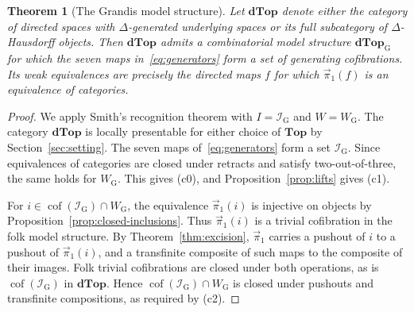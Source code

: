 \documentclass[12pt,a4paper]{amsart}
\newtheorem{theorem}{Theorem}[section]
\theoremstyle{definition}
\renewcommand{\vec}{\overrightarrow}
\newcommand{\D}{\mathbf{dTop}}
\newcommand{\I}{\mathcal I_{\mathrm G}}
\newcommand{\MG}{\D_{\mathrm G}}
\newcommand{\WG}{W_{\mathrm G}}
\newcommand{\PiC}{\vec{\pi}_1}
\newcommand{\GrandisModelStatement}{%
Let $\D$ denote either the category of directed spaces with $\Delta$-generated underlying spaces or its full subcategory of $\Delta$-Hausdorff objects. Then $\D$ admits a combinatorial model structure $\MG$ for which the seven maps in~\eqref{eq:generators} form a set of generating cofibrations. Its weak equivalences are precisely the directed maps $f$ for which $\PiC(f)$ is an equivalence of categories.
}
\begin{document}
\begin{theorem}[The Grandis model structure]\label{thm:model}
\GrandisModelStatement
\end{theorem}
\begin{proof}
We apply Smith's recognition theorem with $I=\I$ and $W=\WG$. The category $\D$ is locally presentable for either choice of $\mathbf{Top}$ by Section~\ref{sec:setting}. The seven maps of~\eqref{eq:generators} form a set $\I$. Since equivalences of categories are closed under retracts and satisfy two-out-of-three, the same holds for $\WG$. This gives \textup{(c0)}, and Proposition~\ref{prop:lifts} gives \textup{(c1)}.

For $i\in\operatorname{cof}(\I)\cap\WG$, the equivalence $\PiC(i)$ is injective on objects by Proposition~\ref{prop:closed-inclusions}. Thus $\PiC(i)$ is a trivial cofibration in the folk model structure. By Theorem~\ref{thm:excision}, $\PiC$ carries a pushout of $i$ to a pushout of $\PiC(i)$, and a transfinite composite of such maps to the composite of their images. Folk trivial cofibrations are closed under both operations, as is $\operatorname{cof}(\I)$ in $\D$. Hence $\operatorname{cof}(\I)\cap\WG$ is closed under pushouts and transfinite compositions, as required by \textup{(c2)}.


\end{proof}
\end{document}
